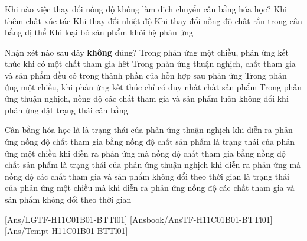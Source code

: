 \begin{ex}
	Khi nào việc thay đổi nồng độ không làm dịch chuyển cân bằng hóa học?
	\choice
	{Khi thêm chất xúc tác}
	{Khi thay đổi nhiệt độ}
	{\True Khi thay đổi nồng độ chất rắn trong cân bằng dị thể}
	{Khi loại bỏ sản phẩm khỏi hệ phản ứng}
\end{ex}
\begin{ex}Nhận xét nào sau đây \textbf{không} đúng?
\choice
{Trong phản ứng một chiều, phản ứng kết thúc khi có một chất tham gia hêt}
{Trong phản ứng thuận nghịch, chất tham gia và sản phẩm đều có trong thành phần của hỗn hợp sau phản ứng}
{\True Trong phản ứng một chiều, khi phản ứng kết thúc chỉ có duy nhất chất sản phẩm}
{ Trong phản ứng thuận nghịch, nồng độ các chất tham gia và sản phẩm luôn không đổi khi phản ứng đật trạng thái cân bằng}
\end{ex}
\begin{ex}Cân bằng hóa học là
	\choice
	{là trạng thái của phản ứng thuận nghịch khi diễn ra phản ứng  nồng độ chất tham gia bằng nồng độ chất sản phẩm}
	{là trạng thái của phản ứng một chiều khi diễn ra phản ứng mà nồng độ chất tham gia bằng nồng độ chất sản phẩm }
	{\True là trạng thái của phản ứng thuận nghịch  khi diễn ra phản ứng mà nồng độ các chất tham gia và sản phẩm không đổi theo thời gian}
	{là trạng thái của phản ứng một chiều mà khi diễn ra phản ứng nồng độ các chất tham gia và sản phẩm không đổi theo thời gian}
\end{ex}
[Ans/LGTF-H11C01B01-BTTl01]
[Ansbook/AnsTF-H11C01B01-BTTl01]
[Ans/Tempt-H11C01B01-BTTl01]
